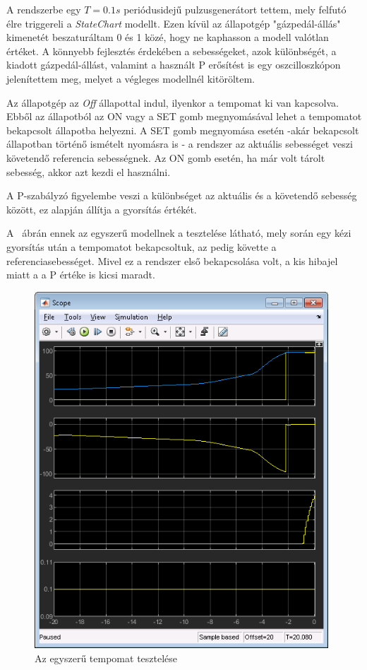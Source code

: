A rendszerbe egy $T=0.1s$ periódusidejű pulzusgenerátort tettem, mely felfutó élre triggereli a \textit{StateChart} modellt. Ezen kívül az állapotgép "gázpedál-állás" kimenetét beszaturáltam 0 és 1 közé, hogy ne kaphasson a modell valótlan értéket. A könnyebb fejlesztés érdekében a sebességeket, azok különbségét, a kiadott gázpedál-állást, valamint a használt P erősítést is egy oszcilloszkópon jelenítettem meg, melyet a végleges modellnél kitöröltem.

Az állapotgép az \textit{Off} állapottal indul, ilyenkor a tempomat ki van kapcsolva. Ebből az állapotból az ON vagy a SET gomb megnyomásával lehet a tempomatot bekapcsolt állapotba helyezni. A SET gomb megnyomása esetén -akár bekapcsolt állapotban történő ismételt nyomásra is - a rendszer az aktuális sebességet veszi követendő referencia sebességnek. Az ON gomb esetén, ha már volt tárolt sebesség, akkor azt kezdi el használni.

A P-szabályzó figyelembe veszi a különbséget az aktuális és a követendő sebesség között, ez alapján állítja a gyorsítás értékét.

A ~ábrán ennek az egyszerű modellnek a tesztelése látható, mely során egy kézi gyorsítás után a tempomatot bekapcsoltuk, az pedig követte a referenciasebességet. Mivel ez a rendszer első bekapcsolása volt, a kis hibajel miatt a a P értéke is kicsi maradt. 

\begin{figure}[!ht]
\centering
\includegraphics[width=110mm,keepaspectratio]{figures/2m04/f2_scope_2.png}
\caption{Az egyszerű tempomat tesztelése}
\label{fig:scope1}
\end{figure}


